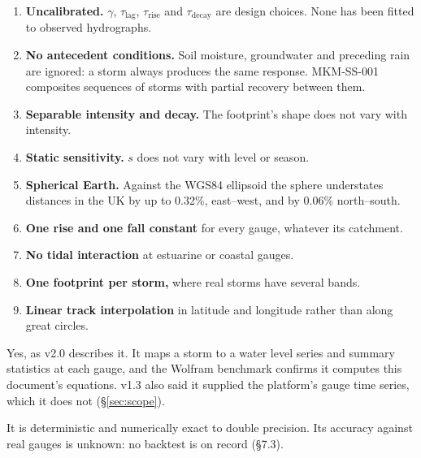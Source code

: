 \documentclass[11pt,a4paper]{article}
\begin{document}
\mkmlimitations

\begin{enumerate}[nosep]
    \item \textbf{Uncalibrated.} $\gamma$, $\tau_{\text{lag}}$, $\tau_{\text{rise}}$ and
          $\tau_{\text{decay}}$ are design choices. None has been fitted to observed
          hydrographs.
    \item \textbf{No antecedent conditions.} Soil moisture, groundwater and preceding
          rain are ignored: a storm always produces the same response. MKM-SS-001
          composites sequences of storms with partial recovery between them.
    \item \textbf{Separable intensity and decay.} The footprint's shape does not vary
          with intensity.
    \item \textbf{Static sensitivity.} $s$ does not vary with level or season.
    \item \textbf{Spherical Earth.} Against the WGS84 ellipsoid the sphere understates
          distances in the UK by up to 0.32\%, east--west, and by 0.06\% north--south.
    \item \textbf{One rise and one fall constant} for every gauge, whatever its
          catchment.
    \item \textbf{No tidal interaction} at estuarine or coastal gauges.
    \item \textbf{One footprint per storm,} where real storms have several bands.
    \item \textbf{Linear track interpolation} in latitude and longitude rather than
          along great circles.
\end{enumerate}

\mkmgovernance

Yes, as v2.0 describes it. It maps a storm to a water level series and summary statistics
at each gauge, and the Wolfram benchmark confirms it computes this document's equations.
v1.3 also said it supplied the platform's gauge time series, which it does not
(\S\ref{sec:scope}).

It is deterministic and numerically exact to double precision. Its accuracy against real
gauges is unknown: no backtest is on record (\S7.3).
\end{document}
